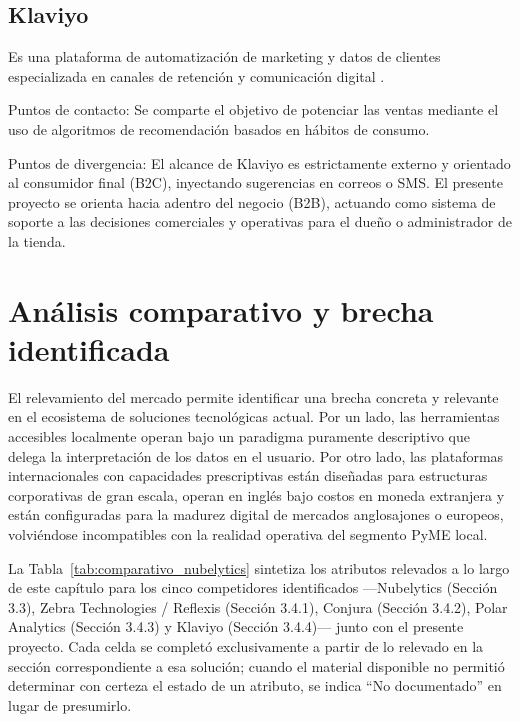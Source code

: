 \subsection{Klaviyo}

Es una plataforma de automatización de marketing y datos de clientes especializada en canales de retención y comunicación digital \parencite{Klaviyo2025}.

Puntos de contacto: Se comparte el objetivo de potenciar las ventas mediante el uso de algoritmos de recomendación basados en hábitos de consumo.

Puntos de divergencia: El alcance de Klaviyo es estrictamente externo y orientado al consumidor final (B2C), inyectando sugerencias en correos o SMS. El presente proyecto se orienta hacia adentro del negocio (B2B), actuando como sistema de soporte a las decisiones comerciales y operativas para el dueño o administrador de la tienda.

\section{Análisis comparativo y brecha identificada}

El relevamiento del mercado permite identificar una brecha concreta y relevante en el ecosistema de soluciones tecnológicas actual. Por un lado, las herramientas accesibles localmente operan bajo un paradigma puramente descriptivo que delega la interpretación de los datos en el usuario. Por otro lado, las plataformas internacionales con capacidades prescriptivas están diseñadas para estructuras corporativas de gran escala, operan en inglés bajo costos en moneda extranjera y están configuradas para la madurez digital de mercados anglosajones o europeos, volviéndose incompatibles con la realidad operativa del segmento PyME local.

La Tabla~\ref{tab:comparativo_nubelytics} sintetiza los atributos relevados a lo largo de este capítulo para los cinco competidores identificados ---Nubelytics (Sección 3.3), Zebra Technologies / Reflexis (Sección 3.4.1), Conjura (Sección 3.4.2), Polar Analytics (Sección 3.4.3) y Klaviyo (Sección 3.4.4)--- junto con el presente proyecto. Cada celda se completó exclusivamente a partir de lo relevado en la sección correspondiente a esa solución; cuando el material disponible no permitió determinar con certeza el estado de un atributo, se indica ``No documentado'' en lugar de presumirlo.

